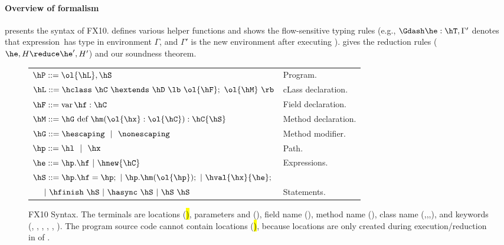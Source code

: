 \paragraph{Overview of formalism}
 presents the syntax of FX10.
 defines various helper functions and shows the flow-sensitive typing rules
    (e.g., $\Gdash \he:\hT, \Gamma'$ denotes that expression~\he has type \hT in environment $\Gamma$, and $\Gamma'$ is the new environment after executing \he).
 gives the reduction rules ($\he,H \reduce \he',H'$) and our soundness theorem.




\begin{figure}[htpb!]
\begin{center}
\begin{tabular}{|l|l|}
\hline

$\hP ::= \ol{\hL},\hS$ & Program. \\

$\hL ::= \hclass ~ \hC~\hextends~\hD~\lb~\ol{\hF};~\ol{\hM}~\rb$
& cLass declaration. \\

$\hF ::= \mbox{var}\,\hf:\hC$
& Field declaration. \\

$\hM ::= \hG\ \mbox{def}\ \hm(\ol{\hx}:\ol{\hC}):\hC\{\hS\}$
& Method declaration. \\

$\hG ::= \hescaping ~~|~~ \nonescaping$
& Method modifier. \\

$\hp ::= \hl ~~|~~ \hx$
& Path. \\ %

$\he ::=  \hp.\hf  ~|~ \hnew{\hC}$ 
& Expressions. \\ %

$\hS ::=  \hp.\hf = \hp; ~|~ \hp.\hm(\ol{\hp});  ~|~ \hval{\hx}{\he};$ &\\
$~~~~|~ \hfinish~\hS~|~ \hasync~\hS ~|~ \hS\ \hS$
& Statements. \\ %

\hline
\end{tabular}
\end{center}
\caption{FX10 Syntax.
    The terminals are locations (\hl), parameters and \this (\hx), field name (\hf), method name (\hm), class name (\hB,\hC,\hD,\hObject),
        and keywords (\hescaping, \nonescaping, \hhnew, \finish, \async, ).
    The program source code cannot contain locations (\hl), because locations are only created during execution/reduction in  of .
    }
\label{Figure:syntax}
\end{figure}


